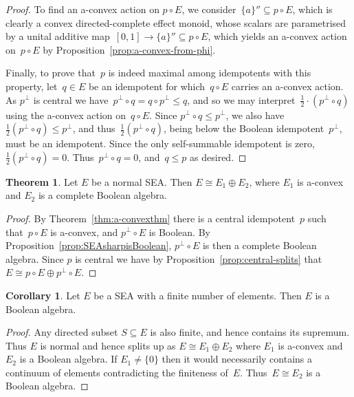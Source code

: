 \documentclass[a4paper, onecolumn, accepted=2020-12-22]{quantumarticle}
\newcommand{\mult}{\mathop{\circ}}
\newcounter{counter}
\theoremstyle{definition}
\newtheorem{theorem}[counter]{Theorem}
\newtheorem{corollary}[counter]{Corollary}
\begin{document}
\begin{proof}
To find an a-convex action on  $p\mult E$, we consider~$\{a\}''\subseteq p\mult E$,
which is clearly a convex directed-complete effect monoid,
whose scalars are parametrised by a
  unital additive map~$[0,1] \to \{a\}'' \subseteq p \mult E$,
which yields an a-convex action on~$p \mult E$ 
by Proposition~\ref{prop:a-convex-from-phi}.

Finally, to prove that~$p$ is indeed maximal among idempotents with this property,
let~$q \in E$ be an idempotent for which~$q \mult E$ carries an a-convex action.
As $p^\perp$ is central we have~$p^\perp \mult q = q\mult p^\perp \leq q$, 
and so we may interpret~$\frac{1}{2}\cdot (p^\perp \mult q)$
using the a-convex action on~$q\mult E$.
Since $p^\perp \mult q \leq p^\perp$, 
we also have $\frac{1}{2} (p^\perp \mult q) \leq p^\perp$,
and thus~$\frac12 (p^\perp\mult q)$, 
being below the Boolean idempotent~$p^\perp$,
must be an idempotent. 
Since the only self-summable idempotent is zero,
$\frac{1}{2} (p^\perp \mult q)=0$.
    Thus~$p^\perp \mult q = 0$,
    and~$q \leq p$ as desired.
\end{proof}

\begin{theorem}\label{thm:SEAsplitupinconvexandsharp}
    Let $E$ be a normal SEA. Then $E\cong E_1\oplus E_2$, where $E_1$ is a-convex and $E_2$ is a complete Boolean algebra.
\end{theorem}
\begin{proof}
    By Theorem~\ref{thm:a-convexthm} there is a central idempotent~$p$
    such that~$p\mult
    E$ is a-convex, and $p^\perp\mult E$ is Boolean.
    By Proposition~\ref{prop:SEAsharpisBoolean}, $p^\perp\mult E$
    is then a complete Boolean algebra. Since $p$ is central
        we have by Proposition~\ref{prop:central-splits} that $E\cong p\mult E\oplus
    p^\perp \mult E$.
\end{proof}

\begin{corollary}\label{cor:finite-Boolean}
    Let $E$ be a SEA with a finite number of elements. Then $E$ is a Boolean algebra.
\end{corollary}
\begin{proof}
Any directed subset $S\subseteq E$ is also finite, and hence
    contains its supremum. Thus $E$ is normal and
    hence splits up as $E\cong E_1\oplus E_2$ where $E_1$ is a-convex
    and $E_2$ is a Boolean algebra. If $E_1 \neq \{0\}$ then it
    would necessarily contains a continuum of elements contradicting
    the finiteness of~$E$. Thus~$E \cong E_2$ is a Boolean algebra.
\end{proof}
\end{document}
